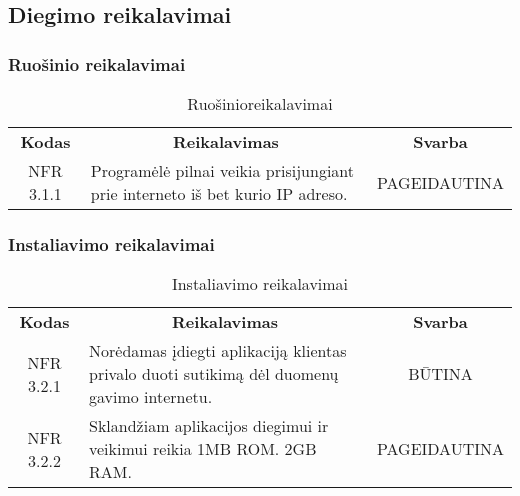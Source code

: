 \documentclass{VUMIFPSkursinis}
\begin{document}
\pagebreak

\subsection{Diegimo reikalavimai}

\subsubsection{Ruošinio reikalavimai}
\begin{center}
	\begin{table}[H]
	\begin{tabular}{|p{2cm}|p{}|p{}|}
	\hline
	    \rowcolor{lightgray}
		\multicolumn{3}{|c|}{Ruošinio reikalavimai}\\
		
	\hline
		\multicolumn{1}{|c|}{{\bfseries Kodas}}&
		\multicolumn{1}{|c|}{{\bfseries Reikalavimas}}&
		\multicolumn{1}{|c|}{{\bfseries Svarba}}\\
	\hline 	
		\multicolumn{1}{|c|}{NFR 3.1.1}&
		{Programėlė pilnai veikia prisijungiant prie interneto iš bet kurio IP adreso.}&
		\multicolumn{1}{|p{1.5cm}|}{PAGEIDAUTINA}\\	
	
	\hline
	
	
	\end{tabular}
	\caption{Ruošinioreikalavimai}
	\label{table:Ruošinioreikalavimai}
	\end{table}

\end{center}

\subsubsection{Instaliavimo reikalavimai }
\begin{center}
	\begin{table}[H]
	\begin{tabular}{|p{2cm}|p{}|p{}|}
	\hline
	    \rowcolor{lightgray}
		\multicolumn{3}{|c|}{Instaliavimo reikalavimai}\\
		
	\hline
		\multicolumn{1}{|c|}{{\bfseries Kodas}}&
		\multicolumn{1}{|c|}{{\bfseries Reikalavimas}}&
		\multicolumn{1}{|c|}{{\bfseries Svarba}}\\
	\hline 	
		\multicolumn{1}{|c|}{NFR 3.2.1}&
		{Norėdamas įdiegti aplikaciją klientas privalo duoti sutikimą dėl duomenų gavimo internetu.}&
		\multicolumn{1}{|c|}{BŪTINA}\\	
	
	\hline 	
		\multicolumn{1}{|c|}{NFR 3.2.2}&
		{Sklandžiam aplikacijos diegimui ir veikimui reikia 1MB ROM. 2GB RAM.}&
		\multicolumn{1}{|p{1.5cm}|}{PAGEIDAUTINA}\\	
	
	\hline
	
	
	\end{tabular}
	\caption{Instaliavimo reikalavimai}
	\label{table:Instaliavimoreikalavimai}
	\end{table}

\end{center}
\end{document}
